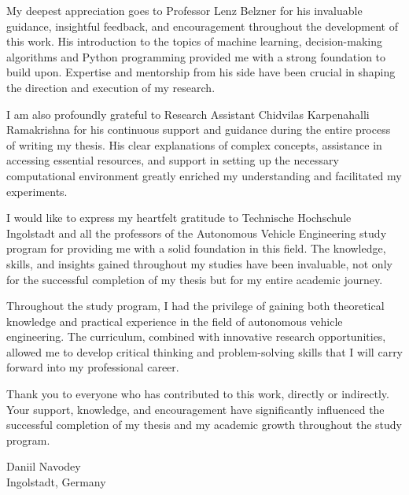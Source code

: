 
My deepest appreciation goes to Professor Lenz Belzner for his invaluable guidance, insightful feedback, and encouragement throughout the development of this work. His introduction to the topics of machine learning, decision-making algorithms and Python programming provided me with a strong foundation to build upon. Expertise and mentorship from his side have been crucial in shaping the direction and execution of my research.

I am also profoundly grateful to Research Assistant Chidvilas Karpenahalli Ramakrishna for his continuous support and guidance during the entire process of writing my thesis.  His clear explanations of complex concepts, assistance in accessing essential resources, and support in setting up the necessary computational environment greatly enriched my understanding and facilitated my experiments.

I would like to express my heartfelt gratitude to Technische Hochschule Ingolstadt and all the professors of the Autonomous Vehicle Engineering study program for providing me with a solid foundation in this field. The knowledge, skills, and insights gained throughout my studies have been invaluable, not only for the successful completion of my thesis but for my entire academic journey.

Throughout the study program, I had the privilege of gaining both theoretical knowledge and practical experience in the field of autonomous vehicle engineering. The curriculum, combined with innovative research opportunities, allowed me to develop critical thinking and problem-solving skills that I will carry forward into my professional career.

Thank you to everyone who has contributed to this work, directly or indirectly. Your support, knowledge, and encouragement have significantly influenced the successful completion of my thesis and my academic growth throughout the study program.
\vspace*{1.5cm}
		
Daniil Navodey\\

Ingolstadt, Germany
